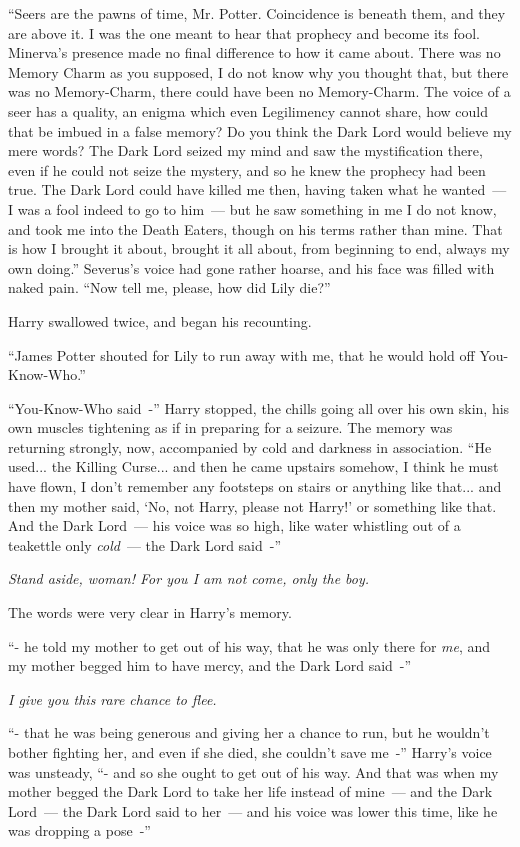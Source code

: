 ``Seers are the pawns of time, Mr. Potter. Coincidence is beneath them, and they are above it. I was the one meant to hear that prophecy and become its fool. Minerva's presence made no final difference to how it came about. There was no Memory Charm as you supposed, I do not know why you thought that, but there was no Memory-Charm, there could have been no Memory-Charm. The voice of a seer has a quality, an enigma which even Legilimency cannot share, how could that be imbued in a false memory? Do you think the Dark Lord would believe my mere words? The Dark Lord seized my mind and saw the mystification there, even if he could not seize the mystery, and so he knew the prophecy had been true. The Dark Lord could have killed me then, having taken what he wanted~--- I was a fool indeed to go to him~--- but he saw something in me I do not know, and took me into the Death Eaters, though on his terms rather than mine. That is how I brought it about, brought it all about, from beginning to end, always my own doing.'' Severus's voice had gone rather hoarse, and his face was filled with naked pain. ``Now tell me, please, how did Lily die?''

Harry swallowed twice, and began his recounting.

``James Potter shouted for Lily to run away with me, that he would hold off You-Know-Who.''

``You-Know-Who said~-'' Harry stopped, the chills going all over his own skin, his own muscles tightening as if in preparing for a seizure. The memory was returning strongly, now, accompanied by cold and darkness in association. ``He used... the Killing Curse... and then he came upstairs somehow, I think he must have flown, I don't remember any footsteps on stairs or anything like that... and then my mother said, `No, not Harry, please not Harry!' or something like that. And the Dark Lord~--- his voice was so high, like water whistling out of a teakettle only \emph{cold}~--- the Dark Lord said~-''

\emph{Stand aside, woman! For you I am not come, only the boy.}

The words were very clear in Harry's memory.

``- he told my mother to get out of his way, that he was only there for \emph{me}, and my mother begged him to have mercy, and the Dark Lord said~-''

\emph{I give you this rare chance to flee.}

``- that he was being generous and giving her a chance to run, but he wouldn't bother fighting her, and even if she died, she couldn't save me~-'' Harry's voice was unsteady, ``- and so she ought to get out of his way. And that was when my mother begged the Dark Lord to take her life instead of mine~--- and the Dark Lord~--- the Dark Lord said to her~--- and his voice was lower this time, like he was dropping a pose~-''

